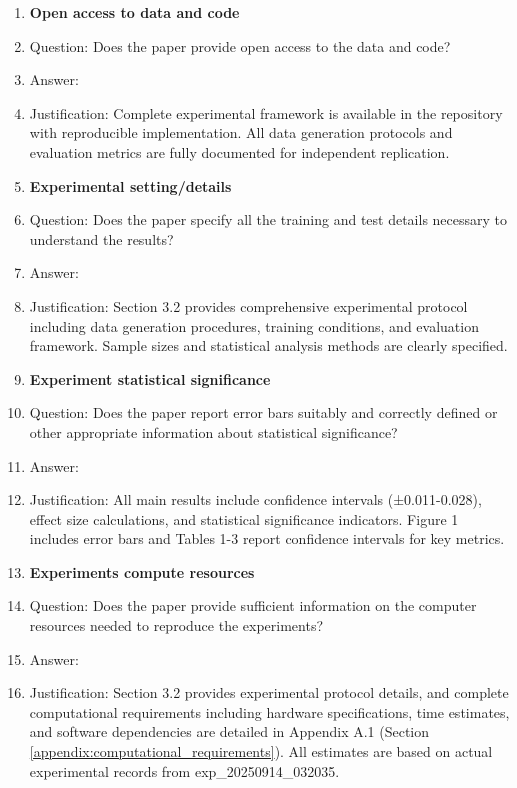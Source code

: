 \documentclass{article}
\begin{document}
\begin{enumerate}
\item {\bf Open access to data and code}
    \item[] Question: Does the paper provide open access to the data and code?
    \item[] Answer: \answerYes{}
    \item[] Justification: Complete experimental framework is available in the repository with reproducible implementation. All data generation protocols and evaluation metrics are fully documented for independent replication.

\item {\bf Experimental setting/details}
    \item[] Question: Does the paper specify all the training and test details necessary to understand the results?
    \item[] Answer: \answerYes{}
    \item[] Justification: Section 3.2 provides comprehensive experimental protocol including data generation procedures, training conditions, and evaluation framework. Sample sizes and statistical analysis methods are clearly specified.

\item {\bf Experiment statistical significance}
    \item[] Question: Does the paper report error bars suitably and correctly defined or other appropriate information about statistical significance?
    \item[] Answer: \answerYes{}
    \item[] Justification: All main results include confidence intervals (±0.011-0.028), effect size calculations, and statistical significance indicators. Figure 1 includes error bars and Tables 1-3 report confidence intervals for key metrics.

\item {\bf Experiments compute resources}
    \item[] Question: Does the paper provide sufficient information on the computer resources needed to reproduce the experiments?
    \item[] Answer: \answerYes{}
    \item[] Justification: Section 3.2 provides experimental protocol details, and complete computational requirements including hardware specifications, time estimates, and software dependencies are detailed in Appendix A.1 (Section \ref{appendix:computational_requirements}). All estimates are based on actual experimental records from exp\_20250914\_032035.


\end{enumerate}
\end{document}
